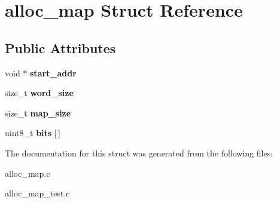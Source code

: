 \hypertarget{structalloc__map}{\section{alloc\-\_\-map Struct Reference}
\label{structalloc__map}
}
\subsection*{Public Attributes}
\begin{DoxyCompactItemize}
\item 
\hypertarget{structalloc__map_a5369c225ec91e1ff91eb944ef62b1984}{void $\ast$ {\bfseries start\-\_\-addr}}\label{structalloc__map_a5369c225ec91e1ff91eb944ef62b1984}

\item 
\hypertarget{structalloc__map_a5ea24384473e323240d60a5858b03775}{size\-\_\-t {\bfseries word\-\_\-size}}\label{structalloc__map_a5ea24384473e323240d60a5858b03775}

\item 
\hypertarget{structalloc__map_a02ce00f66fbf036ead3547a919768b7a}{size\-\_\-t {\bfseries map\-\_\-size}}\label{structalloc__map_a02ce00f66fbf036ead3547a919768b7a}

\item 
\hypertarget{structalloc__map_a19fbce4a67826976764185e938807023}{uint8\-\_\-t {\bfseries bits} \mbox{[}$\,$\mbox{]}}\label{structalloc__map_a19fbce4a67826976764185e938807023}

\end{DoxyCompactItemize}


The documentation for this struct was generated from the following files\-:\begin{DoxyCompactItemize}
\item 
alloc\-\_\-map.\-c\item 
alloc\-\_\-map\-\_\-test.\-c\end{DoxyCompactItemize}
